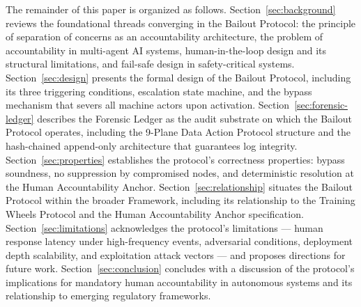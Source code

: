 The remainder of this paper is organized as follows. Section~\ref{sec:background} reviews the foundational threads converging in the Bailout Protocol: the principle of separation of concerns as an accountability architecture, the problem of accountability in multi-agent AI systems, human-in-the-loop design and its structural limitations, and fail-safe design in safety-critical systems. Section~\ref{sec:design} presents the formal design of the Bailout Protocol, including its three triggering conditions, escalation state machine, and the bypass mechanism that severs all machine actors upon activation. Section~\ref{sec:forensic-ledger} describes the Forensic Ledger as the audit substrate on which the Bailout Protocol operates, including the 9-Plane Data Action Protocol structure and the hash-chained append-only architecture that guarantees log integrity. Section~\ref{sec:properties} establishes the protocol's correctness properties: bypass soundness, no suppression by compromised nodes, and deterministic resolution at the Human Accountability Anchor. Section~\ref{sec:relationship} situates the Bailout Protocol within the broader \bxthree Framework, including its relationship to the Training Wheels Protocol and the Human Accountability Anchor specification. Section~\ref{sec:limitations} acknowledges the protocol's limitations — human response latency under high-frequency events, adversarial conditions, deployment depth scalability, and exploitation attack vectors — and proposes directions for future work. Section~\ref{sec:conclusion} concludes with a discussion of the protocol's implications for mandatory human accountability in autonomous systems and its relationship to emerging regulatory frameworks.